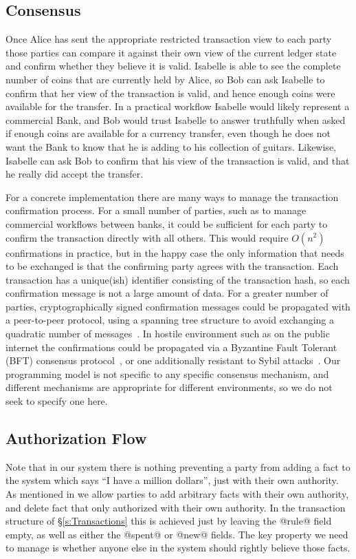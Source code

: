 \subsection{Consensus}
Once Alice has sent the appropriate restricted transaction view to each party those parties can compare it against their own view of the current ledger state and confirm whether they believe it is valid. Isabelle is able to see the complete number of coins that are currently held by Alice, so Bob can ask Isabelle to confirm that her view of the transaction is valid, and hence enough coins were available for the transfer. In a practical workflow Isabelle would likely represent a commercial Bank, and Bob would trust Isabelle to answer truthfully when asked if enough coins are available for a currency transfer, even though he does not want the Bank to know that he is adding to his collection of guitars. Likewise, Isabelle can ask Bob to confirm that his view of the transaction is valid, and that he really did accept the transfer.

For a concrete implementation there are many ways to manage the transaction confirmation process. For a small number of parties, such as to manage commercial workflows between banks, it could be sufficient for each party to confirm the transaction directly with all others. This would require $O(n^2)$ confirmations in practice, but in the happy case the only information that needs to be exchanged is that the confirming party agrees with the transaction. Each transaction has a unique(ish) identifier consisting of the transaction hash, so each confirmation message is not a large amount of data. For a greater number of parties, cryptographically signed confirmation messages could be propagated with a peer-to-peer protocol, using a spanning tree structure to avoid exchanging a quadratic number of messages~\cite{El-Ansary2003:Broadcast}. In hostile environment such as on the public internet the confirmations could be propagated via a Byzantine Fault Tolerant (BFT) consensus protocol~\cite{Lamport1982:Byzantine, Ongaro2014:Consensus}, or one additionally resistant to Sybil attacks~\cite{Gilad2017:Algorand}. Our programming model is not specific to any specific consensus mechanism, and different mechanisms are appropriate for different environments, so we do not seek to specify one here.


\subsection{Authorization Flow}
Note that in our system there is nothing preventing a party from adding a fact to the system which says ``I have a million dollars'', just with their own authority. As mentioned in \label{s:Authority} we allow parties to add arbitrary facts with their own authority, and delete fact that only authorized with their own authority. In the transaction structure of \S\ref{s:Transactions} this is achieved just by leaving the @rule@ field empty, as well as either the @spent@ or @new@ fields. The key property we need to manage is whether anyone else in the system should rightly believe those facts.

